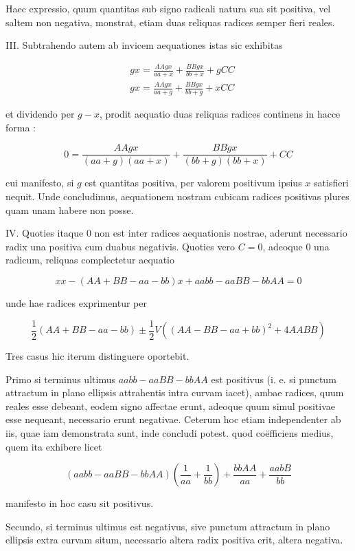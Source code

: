 \documentclass[10pt]{article}
\begin{document}
Haec expressio, quum quantitas sub signo radicali natura sua sit positiva, vel saltem non negativa, monstrat, etiam duas reliquas radices semper fieri reales.

III. Subtrahendo autem ab invicem aequationes istas sic exhibitas

\[
\begin{aligned}
& g x=\frac{A A g x}{a a+x}+\frac{B B g x}{b b+x}+g C C \\
& g x=\frac{A A g x}{a a+g}+\frac{B B g x}{b b+g}+x C C
\end{aligned}
\]

et dividendo per \(g-x\), prodit aequatio duas reliquas radices continens in hacce forma :

\[
0=\frac{A A g x}{(a a+g)(a a+x)}+\frac{B B g x}{(b b+g)(b b+x)}+C C
\]

cui manifesto, si \(g\) est quantitas positiva, per valorem positivum ipsius \(x\) satisfieri nequit. Unde concludimus, aequationem nostram cubicam radices positivas plures quam unam habere non posse.

IV. Quoties itaque 0 non est inter radices aequationis nostrae, aderunt necessario radix una positiva cum duabus negativis. Quoties vero \(C=0\), adeoque 0 una radicum, reliquas complectetur aequatio

\[
x x-(A A+B B-a a-b b) x+a a b b-a a B B-b b A A=0
\]

unde hae radices exprimentur per

\[
\frac{1}{2}(A A+B B-a a-b b) \pm \frac{1}{2} V\left((A A-B B-a a+b b)^{2}+4 A A B B\right)
\]

Tres casus hic iterum distinguere oportebit.

Primo si terminus ultimus \(a a b b-a a B B-b b A A\) est positivus (i. e. si punctum attractum in plano ellipsis attrahentis intra curvam iacet), ambae radices, quum reales esse debeant, eodem signo affectae erunt, adeoque quum simul positivae esse nequeant, necessario erunt negativae. Ceterum hoc etiam independenter ab iis, quae iam demonstrata sunt, inde concludi potest. quod coëfficiens medius, quem ita exhibere licet

\[
(a a b b-a a B B-b b A A)\left(\frac{1}{a a}+\frac{1}{b b}\right)+\frac{b b A A}{a a}+\frac{a a b B}{b b}
\]

manifesto in hoc casu sit positivus.

Secundo, si terminus ultimus est negativus, sive punctum attractum in plano ellipsis extra curvam situm, necessario altera radix positiva erit, altera negativa.
\end{document}
